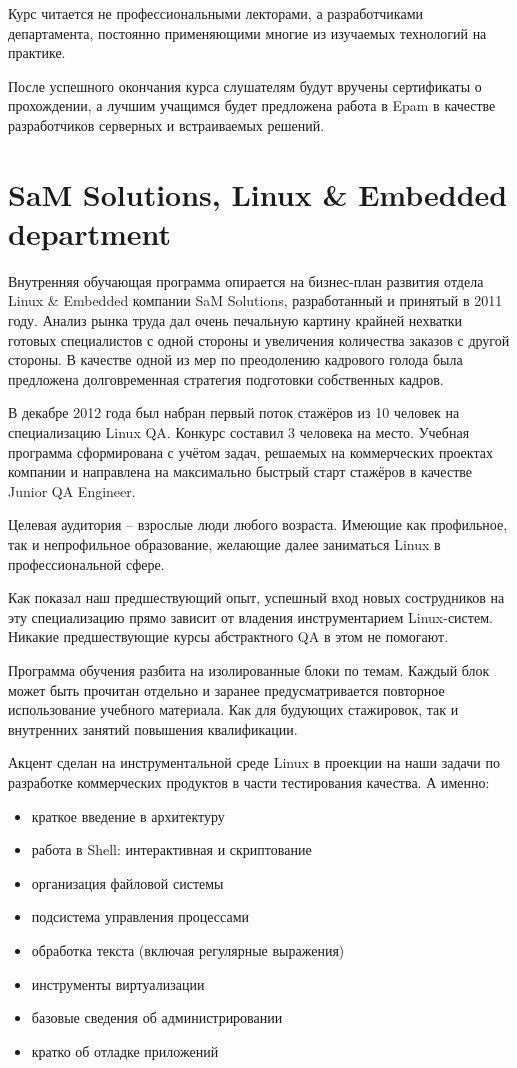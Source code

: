 \documentclass[10pt, a5paper]{article}
\begin{document}
Курс читается не профессиональными лекторами, а разработчиками департамента, постоянно применяющими многие из изучаемых технологий на практике.

После успешного окончания курса слушателям будут вручены сертификаты о прохождении, а лучшим учащимся будет предложена работа в Epam в качестве разработчиков серверных и встраиваемых решений.

\section*{SaM Solutions, Linux \& Embedded department}

Внутренняя обучающая программа опирается на бизнес-план развития отдела Linux \& Embedded компании SaM Solutions, разработанный и принятый в 2011 году. Анализ рынка труда дал очень печальную картину крайней нехватки готовых специалистов с одной стороны и увеличения количества заказов с другой стороны. В качестве одной из мер по преодолению кадрового голода была предложена долговременная стратегия подготовки собственных кадров.

В декабре 2012 года был набран первый поток стажёров из 10 человек на специализацию Linux QA. Конкурс составил 3 человека на место. Учебная программа сформирована с учётом задач, решаемых на коммерческих проектах компании и направлена на максимально быстрый старт стажёров в качестве Junior QA Engineer.

Целевая аудитория -- взрослые люди любого возраста. Имеющие как профильное, так и непрофильное образование, желающие далее заниматься Linux в профессиональной сфере.

Как показал наш предшествующий опыт, успешный вход новых сострудников на эту специализацию прямо зависит от владения инструментарием Linux-систем. Никакие предшествующие курсы абстрактного QA в этом не помогают.

Программа обучения разбита на изолированные блоки по темам. Каждый блок может быть прочитан отдельно и заранее предусматривается повторное использование учебного материала. Как для будующих стажировок, так и внутренних занятий повышения квалификации.

Акцент сделан на инструментальной среде Linux в проекции на наши задачи по разработке коммерческих продуктов в части тестирования качества. А именно:

\begin{itemize}
  \item краткое введение в архитектуру
  \item работа в Shell: интерактивная и скриптование
  \item организация файловой системы
  \item подсистема управления процессами
  \item обработка текста (включая регулярные выражения)
  \item инструменты виртуализации
  \item базовые сведения об администрировании
  \item кратко об отладке приложений
\end{itemize}
\end{document}
